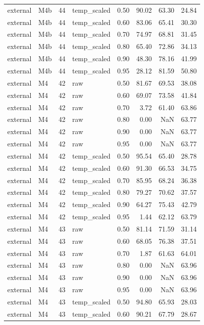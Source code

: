 \begin{tabular}{llrlrrrr}
external & M4b & 44 & temp\_scaled & 0.50 & 90.02 & 63.30 & 24.84 \\
external & M4b & 44 & temp\_scaled & 0.60 & 83.06 & 65.41 & 30.30 \\
external & M4b & 44 & temp\_scaled & 0.70 & 74.97 & 68.81 & 31.45 \\
external & M4b & 44 & temp\_scaled & 0.80 & 65.40 & 72.86 & 34.13 \\
external & M4b & 44 & temp\_scaled & 0.90 & 48.30 & 78.16 & 41.99 \\
external & M4b & 44 & temp\_scaled & 0.95 & 28.12 & 81.59 & 50.80 \\
external & M4 & 42 & raw & 0.50 & 81.67 & 69.53 & 38.08 \\
external & M4 & 42 & raw & 0.60 & 69.07 & 73.58 & 41.84 \\
external & M4 & 42 & raw & 0.70 & 3.72 & 61.40 & 63.86 \\
external & M4 & 42 & raw & 0.80 & 0.00 & NaN & 63.77 \\
external & M4 & 42 & raw & 0.90 & 0.00 & NaN & 63.77 \\
external & M4 & 42 & raw & 0.95 & 0.00 & NaN & 63.77 \\
external & M4 & 42 & temp\_scaled & 0.50 & 95.54 & 65.40 & 28.78 \\
external & M4 & 42 & temp\_scaled & 0.60 & 91.30 & 66.53 & 34.75 \\
external & M4 & 42 & temp\_scaled & 0.70 & 85.95 & 68.24 & 36.38 \\
external & M4 & 42 & temp\_scaled & 0.80 & 79.27 & 70.62 & 37.57 \\
external & M4 & 42 & temp\_scaled & 0.90 & 64.27 & 75.43 & 42.79 \\
external & M4 & 42 & temp\_scaled & 0.95 & 1.44 & 62.12 & 63.79 \\
external & M4 & 43 & raw & 0.50 & 81.14 & 71.59 & 31.14 \\
external & M4 & 43 & raw & 0.60 & 68.05 & 76.38 & 37.51 \\
external & M4 & 43 & raw & 0.70 & 1.87 & 61.63 & 64.01 \\
external & M4 & 43 & raw & 0.80 & 0.00 & NaN & 63.96 \\
external & M4 & 43 & raw & 0.90 & 0.00 & NaN & 63.96 \\
external & M4 & 43 & raw & 0.95 & 0.00 & NaN & 63.96 \\
external & M4 & 43 & temp\_scaled & 0.50 & 94.80 & 65.93 & 28.03 \\
external & M4 & 43 & temp\_scaled & 0.60 & 90.21 & 67.79 & 28.67 \\

\end{tabular}
